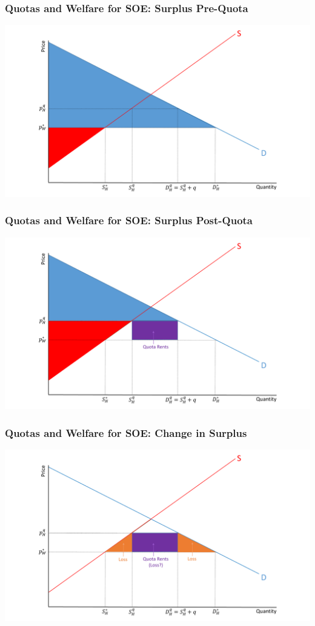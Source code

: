 \documentclass{beamer}
\begin{document}
\begin{frame}
	\frametitle{Quotas and Welfare for SOE: Surplus Pre-Quota}
	
	\includegraphics[scale=0.3]{SL_20.pdf}
	
\end{frame}

\begin{frame}
	\frametitle{Quotas and Welfare for SOE: Surplus Post-Quota}
	
	\includegraphics[scale=0.3]{SL_21.pdf}
	
\end{frame}

\begin{frame}
	\frametitle{Quotas and Welfare for SOE: Change in Surplus}
	
	\includegraphics[scale=0.3]{SL_22.pdf}
	
\end{frame}
\end{document}
